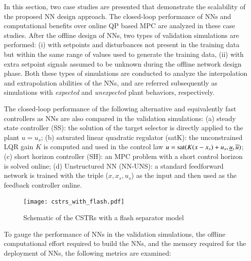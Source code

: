 \documentclass[preprint,5p, twocolumn, authoryear]{elsarticle}
\begin{document}
In this section, two case studies are presented 
that demonstrate the 
scalability of the proposed NN design approach.
The closed-loop performance of NNs and computational benefits over 
online QP based MPC are analyzed in these case studies.
After the offline design of NNs,
two types of validation simulations 
are performed: (i) with setpoints 
and disturbances not present in the training 
data but within the same range of values used to 
generate the training data, (ii) with extra setpoint 
signals assumed to be
unknown during the offline network design phase.
Both these types of simulations are conducted to 
analyze the interpolation and extrapolation 
abilities of the NNs, and are referred subsequently as 
simulations with \textit{expected} and \textit{unexpected} plant behaviors, respectively.

The closed-loop performance of the 
following alternative and 
equivalently fast controllers as NNs are also compared
in the validation simulations:
(a) steady state controller (SS): the solution
of the target selector is directly applied to the plant 
$u = u_s$; (b) saturated linear quadratic regulator (satK):
the unconstrained LQR gain 
$K$ is computed and used in the control law 
$u = \textnormal{sat}(K(x-x_s) + u_s, \underline{u}, \overline{u})$;
(c) short horizon controller (SH): an MPC problem
with a short control horizon is solved online;
(d) Unstructured NN (NN-UNS): a standard feedforward network is 
trained with the triple ($x, x_s, u_s$) as the input
and then used as the feedback controller online.

\begin{figure}[h]
    \centering
    \texttt{[image: cstrs\_with\_flash.pdf]}
    \caption{Schematic of the CSTRs with a flash separator model}
    \label{fig:schematic_cstrs}
\end{figure}

To gauge the performance of NNs in 
the validation simulations, the offline
computational effort required to build the NNs, 
and the memory required for the deployment of NNs,
the following metrics are examined:
\end{document}
